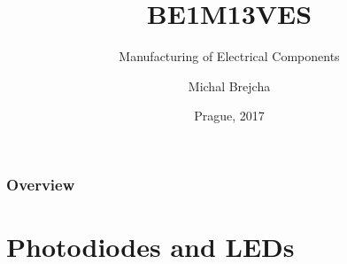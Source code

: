 \documentclass{beamer}
\title[BE1M13VES]{BE1M13VES}
\subtitle[Manufacturing of Electrical Components] {Manufacturing of Electrical Components}
\author[Brejcha]{Michal Brejcha}
\institute[CTU]{CTU in Prague}
\date[Prague, 2017]{Prague, 2017}
\begin{document}
\frame{\titlepage}

\begin{frame}
\frametitle{Overview} 
\tableofcontents
\end{frame}


\section{\texorpdfstring{Photodiodes and LEDs}{Photodiodes and LEDs}}
\end{document}
